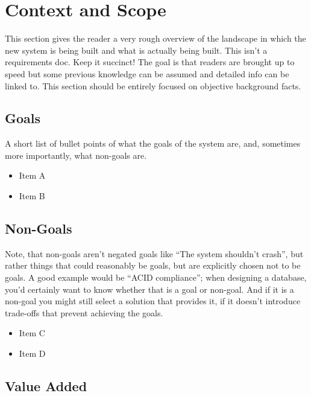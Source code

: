 \documentclass{article}
\begin{document}
\pagebreak
\section{Context and Scope}

This section gives the reader a very rough overview of the landscape in which the new system is being built and what is actually being built. This isn’t a requirements doc. Keep it succinct! The goal is that readers are brought up to speed but some previous knowledge can be assumed and detailed info can be linked to. This section should be entirely focused on objective background facts.

\subsection{Goals}

A short list of bullet points of what the goals of the system are, and, sometimes more importantly, what non-goals are.

\begin{itemize}
    \item Item A
    \item Item B
\end{itemize}

\subsection{Non-Goals}

Note, that non-goals aren’t negated goals like “The system shouldn’t crash”, but rather things that could reasonably be goals, but are explicitly chosen not to be goals. A good example would be “ACID compliance”; when designing a database, you’d certainly want to know whether that is a goal or non-goal. And if it is a non-goal you might still select a solution that provides it, if it doesn’t introduce trade-offs that prevent achieving the goals.

\begin{itemize}
    \item Item C
    \item Item D
\end{itemize}

\subsection{Value Added}
\end{document}
